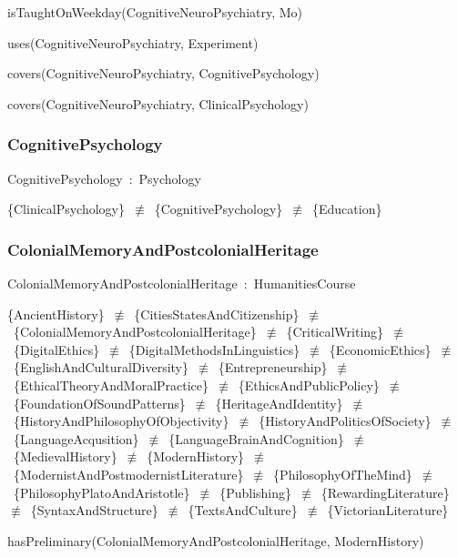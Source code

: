 \documentclass{article}
\begin{document}
isTaughtOnWeekday(CognitiveNeuroPsychiatry, Mo)

uses(CognitiveNeuroPsychiatry, Experiment)

covers(CognitiveNeuroPsychiatry, CognitivePsychology)

covers(CognitiveNeuroPsychiatry, ClinicalPsychology)

\subsubsection*{CognitivePsychology}

CognitivePsychology~:~Psychology

\{ClinicalPsychology\}~\ensuremath{\not\equiv}~\{CognitivePsychology\}~\ensuremath{\not\equiv}~\{Education\}

\subsubsection*{ColonialMemoryAndPostcolonialHeritage}

ColonialMemoryAndPostcolonialHeritage~:~HumanitiesCourse

\{AncientHistory\}~\ensuremath{\not\equiv}~\{CitiesStatesAndCitizenship\}~\ensuremath{\not\equiv}~\{ColonialMemoryAndPostcolonialHeritage\}~\ensuremath{\not\equiv}~\{CriticalWriting\}~\ensuremath{\not\equiv}~\{DigitalEthics\}~\ensuremath{\not\equiv}~\{DigitalMethodsInLinguistics\}~\ensuremath{\not\equiv}~\{EconomicEthics\}~\ensuremath{\not\equiv}~\{EnglishAndCulturalDiversity\}~\ensuremath{\not\equiv}~\{Entrepreneurship\}~\ensuremath{\not\equiv}~\{EthicalTheoryAndMoralPractice\}~\ensuremath{\not\equiv}~\{EthicsAndPublicPolicy\}~\ensuremath{\not\equiv}~\{FoundationOfSoundPatterns\}~\ensuremath{\not\equiv}~\{HeritageAndIdentity\}~\ensuremath{\not\equiv}~\{HistoryAndPhilosophyOfObjectivity\}~\ensuremath{\not\equiv}~\{HistoryAndPoliticsOfSociety\}~\ensuremath{\not\equiv}~\{LanguageAcqusition\}~\ensuremath{\not\equiv}~\{LanguageBrainAndCognition\}~\ensuremath{\not\equiv}~\{MedievalHistory\}~\ensuremath{\not\equiv}~\{ModernHistory\}~\ensuremath{\not\equiv}~\{ModernistAndPostmodernistLiterature\}~\ensuremath{\not\equiv}~\{PhilosophyOfTheMind\}~\ensuremath{\not\equiv}~\{PhilosophyPlatoAndAristotle\}~\ensuremath{\not\equiv}~\{Publishing\}~\ensuremath{\not\equiv}~\{RewardingLiterature\}~\ensuremath{\not\equiv}~\{SyntaxAndStructure\}~\ensuremath{\not\equiv}~\{TextsAndCulture\}~\ensuremath{\not\equiv}~\{VictorianLiterature\}

hasPreliminary(ColonialMemoryAndPostcolonialHeritage, ModernHistory)
\end{document}
